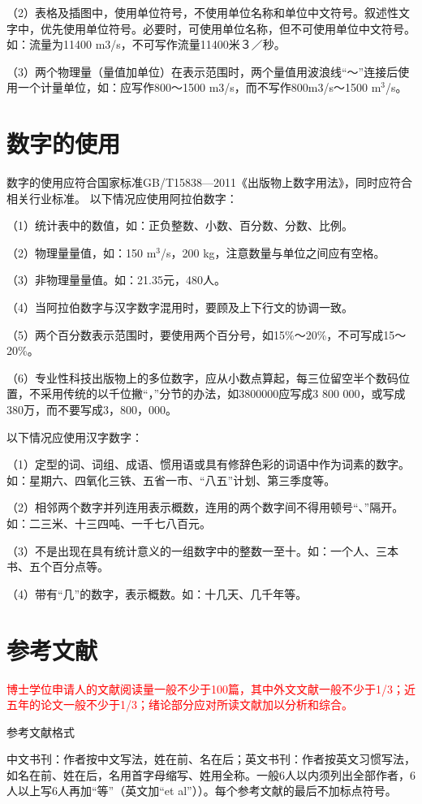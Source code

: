 （2）表格及插图中，使用单位符号，不使用单位名称和单位中文符号。叙述性文字中，优先使用单位符号。必要时，可使用单位名称，但不可使用单位中文符号。如：流量为11400 m3/s，不可写作流量11400米３／秒。

（3）两个物理量（量值加单位）在表示范围时，两个量值用波浪线“～”连接后使用一个计量单位，如：应写作800～1500 m3/s，而不写作800m3/s～1500 m$^3$/s。



\section{数字的使用}
数字的使用应符合国家标准GB/T15838—2011《出版物上数字用法》，同时应符合相关行业标准。
以下情况应使用阿拉伯数字：

（1）统计表中的数值，如：正负整数、小数、百分数、分数、比例。 

（2）物理量量值，如：150 m$^3$/s，200 kg，注意数量与单位之间应有空格。

（3）非物理量量值。如：21.35元，480人。

（4）当阿拉伯数字与汉字数字混用时，要顾及上下行文的协调一致。

（5）两个百分数表示范围时，要使用两个百分号，如15\%～20\%，不可写成15～20\%。

（6）专业性科技出版物上的多位数字，应从小数点算起，每三位留空半个数码位置，不采用传统的以千位撇“，”分节的办法，如3800000应写成3 800 000，或写成380万，而不要写成3，800，000。

以下情况应使用汉字数字：

（1）定型的词、词组、成语、惯用语或具有修辞色彩的词语中作为词素的数字。如：星期六、四氧化三铁、五省一市、“八五”计划、第三季度等。

（2）相邻两个数字并列连用表示概数，连用的两个数字间不得用顿号“、”隔开。如：二三米、十三四吨、一千七八百元。

（3）不是出现在具有统计意义的一组数字中的整数一至十。如：一个人、三本书、五个百分点等。

（4）带有“几”的数字，表示概数。如：十几天、几千年等。

\section{参考文献}
\textcolor{red}{博士学位申请人的文献阅读量一般不少于100篇，其中外文文献一般不少于1/3；近五年的论文一般不少于1/3；绪论部分应对所读文献加以分析和综合。}

参考文献格式

中文书刊：作者按中文写法，姓在前、名在后；英文书刊：作者按英文习惯写法，如名在前、姓在后，名用首字母缩写、姓用全称。一般6人以内须列出全部作者，6人以上写6人再加“等”（英文加“et al”））。每个参考文献的最后不加标点符号。


